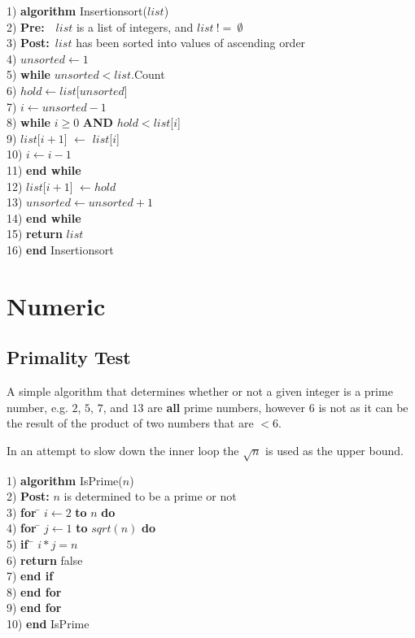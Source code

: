 \documentclass[10pt,oneside,a4paper]{report}
\begin{document}
\begin{tabbing}
1)  \textbf{alg}\= \textbf{orithm} Insertionsort($list$) \\
2)  \> \textbf{Pre:}~~$list$ is a list of integers, and $list~!=~\emptyset$ \\
3)  \> \textbf{Post:}~$list$ has been sorted into values of ascending order \\
4)  \> $unsorted \leftarrow 1$ \\
5)  \> \textbf{whi}\= \textbf{le} $unsorted < list$.Count \\
6)  \> \> $hold \leftarrow list$[$unsorted$] \\
7)  \> \> $i \leftarrow unsorted - 1$ \\
8)  \> \> \textbf{whi}\= \textbf{le} $i \geq 0$ \textbf{AND} $hold < list$[$i$] \\
9)  \> \> \> $list$[$i + 1$] $\leftarrow$ $list$[$i$] \\
10) \> \> \> $i \leftarrow i - 1$ \\
11) \> \> \textbf{end while} \\
12) \> \> $list$[$i+1$] $\leftarrow hold$ \\
13) \> \> $unsorted \leftarrow unsorted + 1$ \\
14) \> \textbf{end while} \\
15) \> \textbf{return} $list$ \\
16) \textbf{end} Insertionsort \\
\end{tabbing}

\chapter{Numeric}
\section{Primality Test} \label{cha:Primality}
A simple algorithm that determines whether or not a given integer is a prime number, e.g. $2$, $5$, $7$, and $13$ are \textbf{all} prime numbers, however $6$ is not as it can be the result of the product of two numbers that are $< 6$.

In an attempt to slow down the inner loop the $\sqrt{n}$ is used as the upper bound.

\begin{tabbing}
1) \textbf{alg}\= \textbf{orithm} IsPrime($n$)\\
2) \> \textbf{Post:} $n$ is determined to be a prime or not \\
3) \> \textbf{for} \= $i \leftarrow 2$ \textbf{to} $n$ \textbf{do}\\
4) \> \> \textbf{for} \= $j \leftarrow 1$ \textbf{to} $sqrt(n)$ \textbf{do}\\
5) \> \> \> \textbf{if}~\= $i * j = n$\\
6) \> \> \> \> \textbf{return} false\\
7) \> \> \> \textbf{end if}\\
8) \> \> \textbf{end for}\\	
9) \> \textbf{end for}\\
10) \textbf{end} IsPrime
\end{tabbing}
\end{document}
